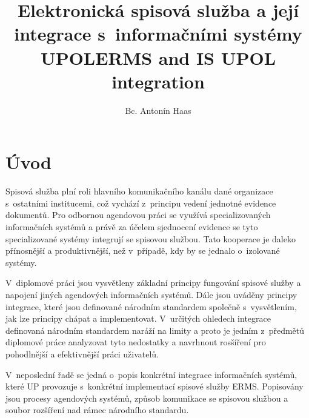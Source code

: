 \documentclass[
  master,
  field=ainfp,
  biblatex,
  language=czech,
  glossaries,
  theorems=false,
  index
]{kidiplom}
\title{Elektronická spisová služba a její integrace s~informačními systémy UPOL}
\title[english]{ERMS and IS UPOL integration}
\author{Bc. Antonín Haas}
\begin{document}
\maketitle



\newcommand{\BibLaTeX}{\textsc{Bib}\LaTeX}


\section{Úvod}
Spisová služba plní roli hlavního komunikačního kanálu dané organizace s~ostatními institucemi, což vychází z~principu vedení jednotné evidence dokumentů. Pro odbornou agendovou práci se využívá specializovaných informačních systémů a právě za účelem sjednocení evidence se tyto specializované systémy integrují se spisovou službou. Tato kooperace je daleko přínosnější a produktivnější, než v~případě, kdy by se jednalo o~izolované systémy.

V~diplomové práci jsou vysvětleny základní principy fungování spisové služby a napojení jiných agendových informačních systémů. Dále jsou uváděny principy integrace, které jsou definované národním standardem společně s~vysvětlením, jak lze principy chápat a implementovat. V~určitých ohledech integrace definovaná národním standardem naráží na limity a proto je jedním z~předmětů diplomové práce analyzovat tyto nedostatky a navrhnout rosšíření pro pohodlnější a efektivnější práci uživatelů. 


V~neposlední řadě se jedná o~popis konkrétní integrace informačních systémů, které \gls{UP} provozuje s~konkrétní implementací spisové služby ERMS. Popisovány jsou procesy agendových systémů, způsob komunikace se spisovou službou a soubor rozšíření nad rámec národního standardu.


\end{document}
